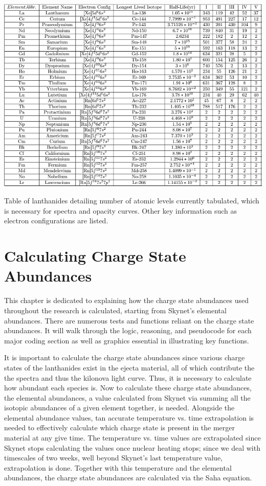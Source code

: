 \documentclass[11pt,a4paper]{article}
\begin{document}

\begin{table}[h!]
  \includegraphics[width=1\textwidth]{level_pic.png}
  \caption{Table of lanthanides detailing number of atomic levels currently tabulated, which is necessary for spectra and opacity curves. Other key information such as electron configurations are listed. }
\end{table}

\pagebreak

\section{Calculating Charge State Abundances}

This chapter is dedicated to explaining how the charge state abundances used throughout the research is calculated, starting from Skynet’s elemental abundances. There are numerous tests and functions reliant on the charge state abundances. It will walk through the logic, reasoning, and pseudocode for each major coding section as well as graphics essential in illustrating key functions. 

It is important to calculate the charge state abundances since various charge states of the lanthanides exist in the ejecta material, all of which contribute the the spectra and thus the kilonova light curve. Thus, it is necessary to calculate how abundant each species is. Now to calculate these charge state abundances, the elemental abundances, a value calculated from Skynet via summing all the isotopic abundances of a given element together, is needed. Alongside the elemental abundance values, tan accurate temperature vs. time extrapolation is needed to effectively calculate which charge state is present in the merger material at any give time. The temperature vs. time values are extrapolated since Skynet stops calculating the values once nuclear heating stops; since we deal with timescales of two weeks, well beyond Skynet's last temperature value, extrapolation is done. Together with this temperature and the elemental abundances, the charge state abundances are calculated via the Saha equation. 
\end{document}

